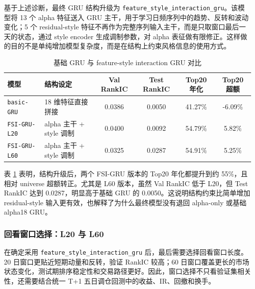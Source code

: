 \documentclass[12pt,a4paper,cn,bibtex]{elegantpaper}
\newcommand{\modelname}[1]{\nolinkurl{#1}}
\begin{document}
基于上述诊断，最终 GRU 结构升级为 \modelname{feature\_style\_interaction\_gru}。该模型将 13 个 alpha 特征送入 GRU 主干，用于学习日频序列中的趋势、反转和波动变化；5 个 residual-style 特征不再作为完整序列输入主干，而是只取窗口最后一天的状态，通过 style encoder 生成调制参数，对 alpha 表征做有限修正。这样做的目的不是单纯增加模型复杂度，而是在结构上约束风格信息的使用方式。

\begin{table}[H]
    \centering
    \scriptsize
    \setlength{\tabcolsep}{2pt}
    \begin{tabular}{p{}p{}cccc}
        \toprule
        \textbf{模型} & \textbf{结构设定} & \textbf{Val RankIC} & \textbf{Test RankIC} & \textbf{Top20 年化} & \textbf{Top20 超额} \\
        \midrule
        \modelname{basic-GRU} & 18 维特征直接拼接 & 0.0386 & 0.0050 & 41.27\% & -6.09\% \\
        \modelname{FSI-GRU-L20} & alpha 主干 + style 调制 & 0.0400 & 0.0092 & 54.79\% & 5.82\% \\
        \modelname{FSI-GRU-L60} & alpha 主干 + style 调制 & 0.0325 & 0.0287 & 54.91\% & 5.25\% \\
        \bottomrule
    \end{tabular}
    \caption{基础 GRU 与 feature-style interaction GRU 对比}
    \label{tab:gru-fsi-upgrade}
\end{table}

表 \ref{tab:gru-fsi-upgrade} 表明，结构升级后，两个 FSI-GRU 版本的 Top20 年化都提升到约 55\%，且相对 universe 超额转正。尤其是 L60 版本，虽然 Val RankIC 低于 L20，但 Test RankIC 达到 0.0287，明显高于基础 GRU 的 0.0050。这说明结构约束比简单增加 residual-style 输入更有效，也解释了为什么最终模型没有退回 alpha-only 或基础 alpha18 GRU。

\subsubsection{回看窗口选择：L20 与 L60}

在确定采用 \modelname{feature\_style\_interaction\_gru} 后，最后需要选择回看窗口长度。20 日窗口更贴近短期动量和反转，验证 RankIC 较高；60 日窗口覆盖更长的市场状态变化，测试期排序稳定性和交易路径更好。因此，窗口选择不只看验证集相关性，还需要结合统一 T+1 五日调仓回测中的收益、IR、回撤和换手。
\end{document}
